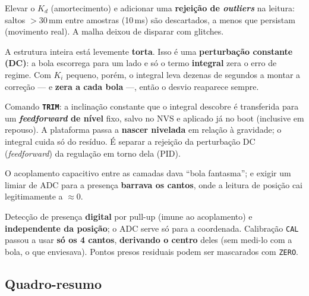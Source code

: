 \documentclass[11pt,a4paper,oneside]{article}
\begin{document}
\begin{solutionbox}
Elevar o $K_d$ (amortecimento) e adicionar uma \textbf{rejeição de \emph{outliers}}
na leitura: saltos $>30$\,mm entre amostras (10\,ms) são descartados, a menos que
persistam (movimento real). A malha deixou de disparar com glitches.
\end{solutionbox}

\begin{problembox}
A estrutura inteira está levemente \textbf{torta}. Isso é uma \textbf{perturbação
constante (DC)}: a bola escorrega para um lado e só o termo \textbf{integral} zera
o erro de regime. Com $K_i$ pequeno, porém, o integral leva dezenas de segundos a
montar a correção — e \textbf{zera a cada bola} —, então o desvio reaparece sempre.
\end{problembox}

\begin{solutionbox}
Comando \textbf{\texttt{TRIM}}: a inclinação constante que o integral descobre é
transferida para um \textbf{\emph{feedforward} de nível} fixo, salvo no NVS e
aplicado já no boot (inclusive em repouso). A plataforma passa a \textbf{nascer
nivelada} em relação à gravidade; o integral cuida só do resíduo. É separar a
rejeição da perturbação DC (\emph{feedforward}) da regulação em torno dela (PID).
\end{solutionbox}

\begin{problembox}
O acoplamento capacitivo entre as camadas dava ``bola fantasma''; e exigir um
limiar de ADC para a presença \textbf{barrava os cantos}, onde a leitura de posição
cai legitimamente a $\approx 0$.
\end{problembox}

\begin{solutionbox}
Detecção de presença \textbf{digital} por pull-up (imune ao acoplamento) e
\textbf{independente da posição}; o ADC serve só para a coordenada. Calibração
\texttt{CAL} passou a usar \textbf{só os 4 cantos}, \textbf{derivando o centro}
deles (sem medi-lo com a bola, o que enviesava). Pontos presos residuais podem ser
mascarados com \texttt{ZERO}.
\end{solutionbox}

\subsection{Quadro-resumo}
\end{document}
